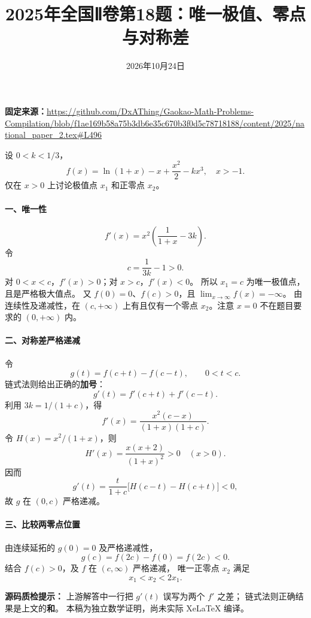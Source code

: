 \documentclass[UTF8,a4paper,11pt]{ctexart}
\title{2025年全国Ⅱ卷第18题：唯一极值、零点与对称差}
\date{2026年10月24日}
\begin{document}
\maketitle
\noindent\textbf{固定来源：}\url{https://github.com/DxAThing/Gaokao-Math-Problems-Compilation/blob/f1ae169b58a75b3db6e35c670b3f0d5c78718188/content/2025/national_paper_2.tex#L496}

设 $0<k<1/3$，
\[
f(x)=\ln(1+x)-x+\frac{x^2}{2}-kx^3,\quad x>-1.
\]
仅在 $x>0$ 上讨论极值点 $x_1$ 和正零点 $x_2$。
\paragraph{一、唯一性}
\[
f'(x)=x^2\left(\frac1{1+x}-3k\right).
\]
令
\[
c=\frac1{3k}-1>0.
\]
对 $0<x<c$，$f'(x)>0$；对 $x>c$，$f'(x)<0$。
所以 $x_1=c$ 为唯一极值点，且是严格极大值点。
又 $f(0)=0$、$f(c)>0$，且
$\lim_{x\to\infty}f(x)=-\infty$。
由连续性及递减性，在 $(c,+\infty)$ 上有且仅有一个零点
$x_2$。注意 $x=0$ 不在题目要求的 $(0,+\infty)$ 内。

\paragraph{二、对称差严格递减}
令
\[
g(t)=f(c+t)-f(c-t),\qquad 0<t<c.
\]
链式法则给出正确的\textbf{加号}：
\[
g'(t)=f'(c+t)+f'(c-t).
\]
利用 $3k=1/(1+c)$，得
\[
f'(x)=\frac{x^2(c-x)}{(1+x)(1+c)}.
\]
令 $H(x)=x^2/(1+x)$，则
\[
H'(x)=\frac{x(x+2)}{(1+x)^2}>0\quad(x>0).
\]
因而
\[
g'(t)=\frac{t}{1+c}\bigl[H(c-t)-H(c+t)\bigr]<0,
\]
故 $g$ 在 $(0,c)$ 严格递减。

\paragraph{三、比较两零点位置}
由连续延拓的 $g(0)=0$ 及严格递减性，
\[
g(c)=f(2c)-f(0)=f(2c)<0.
\]
结合 $f(c)>0$，及 $f$ 在 $(c,\infty)$ 严格递减，
唯一正零点 $x_2$ 满足
\[
\boxed{x_1<x_2<2x_1}.
\]

\bigskip
\noindent\textbf{源码质检提示：}
上游解答中一行把 $g'(t)$ 误写为两个 $f'$ 之差；
链式法则正确结果是上文的\textbf{和}。
本稿为独立数学证明，尚未实际 XeLaTeX 编译。
\end{document}
